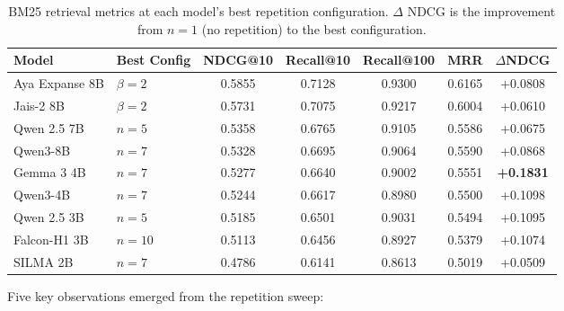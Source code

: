 \begin{table}[htbp]
    \centering
    \caption[BM25 metrics at each model's best repetition setting]{BM25 retrieval metrics at each model's best repetition configuration. $\Delta$ NDCG is the improvement from $n=1$ (no repetition) to the best configuration.}
    \label{tab:bm25_best_config}
    \setlength{\tabcolsep}{4pt}
    \begin{tabular}{@{}llccccc@{}}
        \toprule
        \textbf{Model} & \textbf{Best Config} & \textbf{NDCG@10} & \textbf{Recall@10} & \textbf{Recall@100} & \textbf{MRR} & \textbf{$\Delta$NDCG} \\
        \midrule
        Aya Expanse 8B & $\beta=2$ & 0.5855 & 0.7128 & 0.9300 & 0.6165 & +0.0808 \\
        Jais-2 8B & $\beta=2$ & 0.5731 & 0.7075 & 0.9217 & 0.6004 & +0.0610 \\
        Qwen 2.5 7B & $n=5$ & 0.5358 & 0.6765 & 0.9105 & 0.5586 & +0.0675 \\
        Qwen3-8B & $n=7$ & 0.5328 & 0.6695 & 0.9064 & 0.5590 & +0.0868 \\
        Gemma 3 4B & $n=7$ & 0.5277 & 0.6640 & 0.9002 & 0.5551 & \textbf{+0.1831} \\
        Qwen3-4B & $n=7$ & 0.5244 & 0.6617 & 0.8980 & 0.5500 & +0.1098 \\
        Qwen 2.5 3B & $n=5$ & 0.5185 & 0.6501 & 0.9031 & 0.5494 & +0.1095 \\
        Falcon-H1 3B & $n=10$ & 0.5113 & 0.6456 & 0.8927 & 0.5379 & +0.1074 \\
        SILMA 2B & $n=7$ & 0.4786 & 0.6141 & 0.8613 & 0.5019 & +0.0509 \\
        \bottomrule
    \end{tabular}
\end{table}

Five key observations emerged from the repetition sweep:

